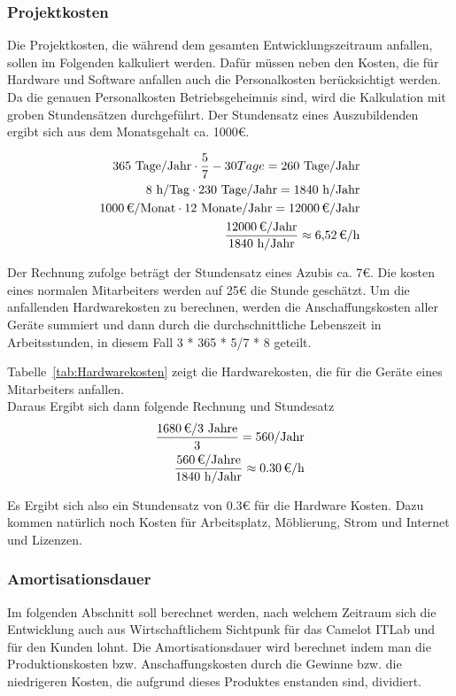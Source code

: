 \subsubsection{Projektkosten}
\label{sec:Projektkosten}
Die Projektkosten, die während dem gesamten Entwicklungszeitraum anfallen, sollen im Folgenden kalkuliert werden. Dafür müssen neben den Kosten, die für Hardware und Software anfallen auch die Personalkosten berücksichtigt werden. Da die genauen Personalkosten Betriebsgeheimnis sind, wird die Kalkulation mit groben Stundensätzen durchgeführt. Der Stundensatz eines Auszubildenden ergibt sich aus dem Monatsgehalt ca. 1000€.
		
\begin{eqnarray}
	365 \mbox{ Tage/Jahr} \cdot \frac{5}{7} - 30 Tage = 260 \mbox{ Tage/Jahr}\\
	8 \mbox{ h/Tag} \cdot 230 \mbox{ Tage/Jahr} = 1840 \mbox{ h/Jahr}\\
	\eur{1000}\mbox{/Monat} \cdot 12 \mbox{ Monate/Jahr} = \eur{12000} \mbox{/Jahr}\\
	\frac{\eur{12000} \mbox{/Jahr}}{1840 \mbox{ h/Jahr}} \approx \eur{6,52}\mbox{/h}
\end{eqnarray}
	
Der Rechnung zufolge beträgt der Stundensatz eines Azubis ca. 7€. Die kosten eines normalen Mitarbeiters werden auf 25€ die Stunde geschätzt. Um die anfallenden Hardwarekosten zu berechnen, werden die Anschaffungskosten aller Geräte summiert und dann durch die durchschnittliche Lebenszeit in Arbeitsstunden, in diesem Fall 3 * 365 * 5/7 * 8 geteilt.
	
Tabelle~\ref{tab:Hardwarekosten} zeigt die Hardwarekosten, die für die Geräte eines Mitarbeiters anfallen.
\\
	
Daraus Ergibt sich dann folgende Rechnung und Stundesatz
\begin{eqnarray}
	\frac{\eur{1680} \mbox{/3 Jahre}}{3} = 560 \mbox{/Jahr}\\
	\frac{\eur{560} \mbox{/Jahre}}{1840 \mbox{ h/Jahr}} \approx \eur{0.30}\mbox{/h}
\end{eqnarray}

Es Ergibt sich also ein Stundensatz von 0.3€ für die Hardware Kosten. Dazu kommen natürlich noch Kosten für Arbeitsplatz, Möblierung, Strom und Internet und Lizenzen.

\subsubsection{Amortisationsdauer}
\label{sec:Amortisationsdauer}
Im folgenden Abschnitt soll berechnet werden, nach welchem Zeitraum sich die Entwicklung auch aus Wirtschaftlichem Sichtpunk für das Camelot ITLab und für den Kunden lohnt. Die Amortisationsdauer wird berechnet indem man die Produktionskosten bzw. Anschaffungskosten durch die Gewinne bzw. die niedrigeren Kosten, die aufgrund dieses Produktes enstanden sind, dividiert.

